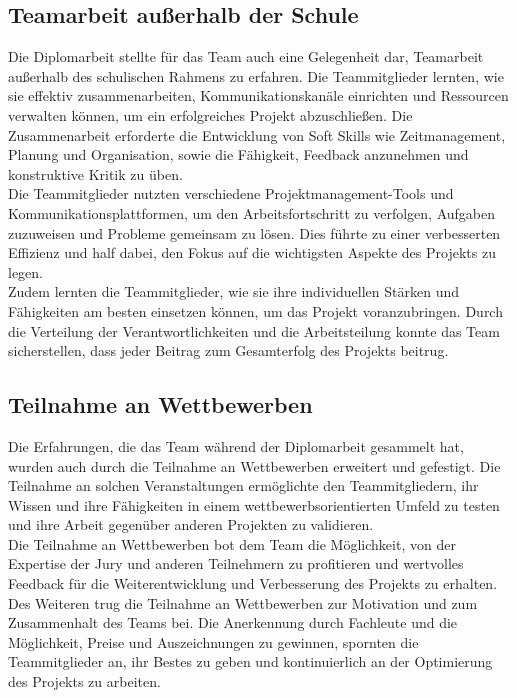 \subsection{Teamarbeit außerhalb der Schule}

Die Diplomarbeit stellte für das Team auch eine Gelegenheit dar, Teamarbeit außerhalb des schulischen Rahmens zu erfahren. Die Teammitglieder lernten, wie sie effektiv zusammenarbeiten, Kommunikationskanäle einrichten und Ressourcen verwalten können, um ein erfolgreiches Projekt abzuschließen. Die Zusammenarbeit erforderte die Entwicklung von Soft Skills wie Zeitmanagement, Planung und Organisation, sowie die Fähigkeit, Feedback anzunehmen und konstruktive Kritik zu üben.
\\
Die Teammitglieder nutzten verschiedene Projektmanagement-Tools und Kommunikationsplattformen, um den Arbeitsfortschritt zu verfolgen, Aufgaben zuzuweisen und Probleme gemeinsam zu lösen. Dies führte zu einer verbesserten Effizienz und half dabei, den Fokus auf die wichtigsten Aspekte des Projekts zu legen.
\\
Zudem lernten die Teammitglieder, wie sie ihre individuellen Stärken und Fähigkeiten am besten einsetzen können, um das Projekt voranzubringen. Durch die Verteilung der Verantwortlichkeiten und die Arbeitsteilung konnte das Team sicherstellen, dass jeder Beitrag zum Gesamterfolg des Projekts beitrug.

\subsection{Teilnahme an Wettbewerben}

Die Erfahrungen, die das Team während der Diplomarbeit gesammelt hat, wurden auch durch die Teilnahme an Wettbewerben erweitert und gefestigt. Die Teilnahme an solchen Veranstaltungen ermöglichte den Teammitgliedern, ihr Wissen und ihre Fähigkeiten in einem wettbewerbsorientierten Umfeld zu testen und ihre Arbeit gegenüber anderen Projekten zu validieren.
\\
Die Teilnahme an Wettbewerben bot dem Team die Möglichkeit, von der Expertise der Jury und anderen Teilnehmern zu profitieren und wertvolles Feedback für die Weiterentwicklung und Verbesserung des Projekts zu erhalten.
\\
Des Weiteren trug die Teilnahme an Wettbewerben zur Motivation und zum Zusammenhalt des Teams bei. Die Anerkennung durch Fachleute und die Möglichkeit, Preise und Auszeichnungen zu gewinnen, spornten die Teammitglieder an, ihr Bestes zu geben und kontinuierlich an der Optimierung des Projekts zu arbeiten.
